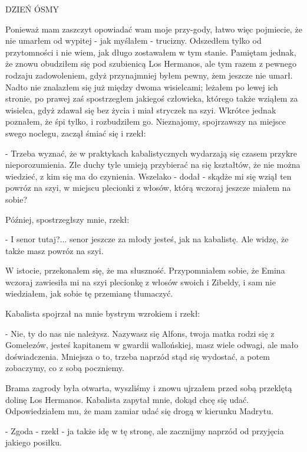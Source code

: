 



DZIEŃ ÓSMY

Ponieważ mam zaszczyt opowiadać wam moje przy-gody, łatwo więc
pojmiecie, że nie umarłem od wypitej - jak myślałem -
trucizny. Odszedłem tylko od przytomności i nie wiem, jak długo
zostawałem w tym stanie. Pamiętam jednak, że znowu obudziłem się pod
szubienicą Los Hermanos, ale tym razem z pewnego rodzaju zadowoleniem,
gdyż przynajmniej byłem pewny, żem jeszcze nie umarł. Nadto nie
znalazłem się już między dwoma wisielcami; leżałem po lewej ich
stronie, po prawej zaś spostrzegłem jakiegoś człowieka, którego także
wziąłem za wisielca, gdyż zdawał się bez życia i miał stryczek na
szyi. Wkrótce jednak poznałem, że śpi tylko, i rozbudziłem
go. Nieznajomy, spojrzawszy na miejsce swego noclegu, zaczął śmiać się
i rzekł:

- Trzeba wyznać, że w praktykach kabalistycznych wydarzają się czasem
przykre nieporozumienia. Złe duchy tyle umieją przybierać na się
kształtów, że nie można wiedzieć, z kim się ma do czynienia. Wszelako
- dodał - skądże mi się wziął ten powróz na szyi, w miejscu plecionki
z włosów, którą wczoraj jeszcze miałem na sobie?

Później, spostrzegłszy mnie, rzekł:

- I senor tutaj?... senor jeszcze za młody jesteś, jak na
kabalistę. Ale widzę, że także masz powróz na szyi.

W istocie, przekonałem się, że ma słuszność. Przypomniałem sobie, że
Emina wczoraj zawiesiła mi na szyi plecionkę z włosów swoich i
Zibeldy, i sam nie wiedziałem, jak sobie tę przemianę tłumaczyć.

Kabalista spojrzał na mnie bystrym wzrokiem i rzekł:

- Nie, ty do nas nie należysz. Nazywasz się Alfons, twoja matka rodzi
się z Gomelezów, jesteś kapitanem w gwardii wallońskiej, masz wiele
odwagi, ale mało doświadczenia. Mniejsza o to, trzeba naprzód stąd się
wydostać, a potem zobaczymy, co z sobą poczniemy.

Brama zagrody była otwarta, wyszliśmy i znowu ujrzałem przed sobą
przeklętą dolinę Los Hermanos. Kabalista zapytał mnie, dokąd chcę się
udać. Odpowiedziałem mu, że mam zamiar udać się drogą w kierunku
Madrytu.

- Zgoda - rzekł - ja także idę w tę stronę, ale zacznijmy naprzód od
przyjęcia jakiego posiłku.

